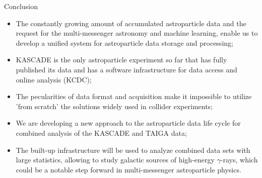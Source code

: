 \begin{frame}{Conclusion}
\small
\begin{itemize}
  \item The constantly growing amount of accumulated astroparticle data and the request for the multi-messenger astronomy and machine learning, enable us to develop a unified system for astroparticle data storage and processing;
  \item KASCADE is the only astroparticle experiment so far that has fully published its data and has a software infrastructure for data access and online analysis (KCDC);
  \item The pecularities of data format and acquisition make it impossible to utilize 'from scratch' the solutions widely used in collider experiments;
  \item We are developing a new approach to the astroparticle data life cycle for combined analysis of the KASCADE and TAIGA data;
  \item The built-up infrastructure will be used to analyze combined data sets with large statistics, allowing to study galactic sources of high-energy $\gamma$-rays, 
  which could be a notable step forward in multi-messenger astroparticle physics.

\end{itemize}
\end{frame}

%
